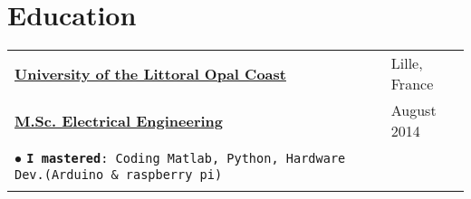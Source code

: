 \documentclass[a4paper, 10pt, oneside]{article}
\begin{document}
\begin{center}
\begin{table}[H]
\begin{adjustwidth}{-.6mm}{-0.5cm}
\begin{tabular} {>{\raggedright}m{137.3mm} >{\raggedleft\arraybackslash}m{4.5cm}}
\end{tabular}

\end{adjustwidth}
\end{table}


\section{Education}

\begin{table}[H]
	\begin{adjustwidth}{-.6mm}{-0.5cm}
		\begin{tabular}
			{>{\raggedright}m{137.3mm}
				>{\raggedleft\arraybackslash}m{4.5cm}}
			\textbf{\href{https://www.univ-littoral.fr/formation/offre-de-formation/masters/master-instrumentation-mesure-metrologie-electronique-et-instrumentation/}{University of the Littoral Opal Coast}} & \hfill Lille, France\\
			\textbf{\href{https://www.univ-littoral.fr/formation/offre-de-formation/masters/master-instrumentation-mesure-metrologie-electronique-et-instrumentation/}{M.Sc. Electrical  Engineering}}  & August 2014\\
			$\bullet$ \texttt{\textbf{I mastered}: Coding Matlab, Python, Hardware Dev.(Arduino \& raspberry pi)}\hspace*{-300mm} & \\ \\
		\end{tabular}
		

\end{adjustwidth}
\end{table}
\end{center}
\end{document}
